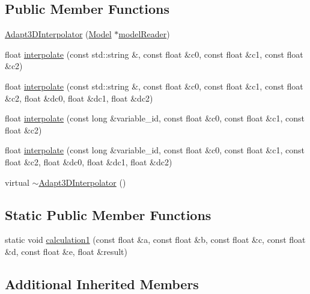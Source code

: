 \subsection*{Public Member Functions}
\begin{DoxyCompactItemize}
\item 
\hyperlink{classccmc_1_1_adapt3_d_interpolator_a79b9d9e9cbfc04e72d34c0853d916514}{Adapt3\-D\-Interpolator} (\hyperlink{classccmc_1_1_model}{Model} $\ast$\hyperlink{classccmc_1_1_interpolator_afee5bb61e5d5a0a7b9152c6f74378c4a}{model\-Reader})
\item 
float \hyperlink{classccmc_1_1_adapt3_d_interpolator_aecaa97aad175a8696d8351607a08158c}{interpolate} (const std\-::string \&, const float \&c0, const float \&c1, const float \&c2)
\item 
float \hyperlink{classccmc_1_1_adapt3_d_interpolator_ab9a45aa8feb07a6d55e45da3d202060c}{interpolate} (const std\-::string \&, const float \&c0, const float \&c1, const float \&c2, float \&dc0, float \&dc1, float \&dc2)
\item 
float \hyperlink{classccmc_1_1_adapt3_d_interpolator_ad6f6e98e2070f7bf9f99be40c127548f}{interpolate} (const long \&variable\-\_\-id, const float \&c0, const float \&c1, const float \&c2)
\item 
float \hyperlink{classccmc_1_1_adapt3_d_interpolator_a62f9740d20678b993f2871c6505f7df3}{interpolate} (const long \&variable\-\_\-id, const float \&c0, const float \&c1, const float \&c2, float \&dc0, float \&dc1, float \&dc2)
\item 
virtual \hyperlink{classccmc_1_1_adapt3_d_interpolator_a43116c61408cf05876999e2c2f1f67fb}{$\sim$\-Adapt3\-D\-Interpolator} ()
\end{DoxyCompactItemize}
\subsection*{Static Public Member Functions}
\begin{DoxyCompactItemize}
\item 
static void \hyperlink{classccmc_1_1_adapt3_d_interpolator_ad041ba3c92e7f5b0b1f3ede0bd9ec7cb}{calculation1} (const float \&a, const float \&b, const float \&c, const float \&d, const float \&e, float \&result)
\end{DoxyCompactItemize}
\subsection*{Additional Inherited Members}


